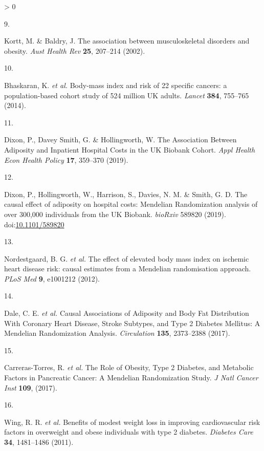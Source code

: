 \documentclass[11pt,twoside]{bristolthesis}
\newlength{\cslhangindent}
\newlength{\csllabelwidth}
\newenvironment{CSLReferences}[2] %
 {%
  \setlength{\parindent}{0pt}
  \ifodd #1 \everypar{\setlength{\hangindent}{\cslhangindent}}\ignorespaces\fi
  \ifnum #2 > 0
  \setlength{\parskip}{#2\baselineskip}
  \fi
 }%
 {}
\newcommand{\CSLLeftMargin}[1]{\parbox[t]{\csllabelwidth}{#1}}
\newcommand{\CSLRightInline}[1]{\parbox[t]{\linewidth - \csllabelwidth}{#1}\break}
\begin{document}
\begin{CSLReferences}{0}{0}
\leavevmode\hypertarget{ref-Kortt2002}{}%
\CSLLeftMargin{9. }
\CSLRightInline{Kortt, M. \& Baldry, J. {The association between musculoskeletal disorders and obesity}. \emph{Aust Health Rev} \textbf{25}, 207--214 (2002).}

\leavevmode\hypertarget{ref-Bhaskaran2014}{}%
\CSLLeftMargin{10. }
\CSLRightInline{Bhaskaran, K. \emph{et al.} {Body-mass index and risk of 22 specific cancers: a population-based cohort study of 5{{}}24 million UK adults}. \emph{Lancet} \textbf{384}, 755--765 (2014).}

\leavevmode\hypertarget{ref-Dixon2019a}{}%
\CSLLeftMargin{11. }
\CSLRightInline{Dixon, P., Davey Smith, G. \& Hollingworth, W. {The Association Between Adiposity and Inpatient Hospital Costs in the UK Biobank Cohort}. \emph{Appl Health Econ Health Policy} \textbf{17}, 359--370 (2019).}

\leavevmode\hypertarget{ref-Dixon2019}{}%
\CSLLeftMargin{12. }
\CSLRightInline{Dixon, P., Hollingworth, W., Harrison, S., Davies, N. M. \& Smith, G. D. {The causal effect of adiposity on hospital costs: Mendelian Randomization analysis of over 300,000 individuals from the UK Biobank}. \emph{bioRxiv} 589820 (2019). doi:\href{https://doi.org/10.1101/589820}{10.1101/589820}}

\leavevmode\hypertarget{ref-Nordestgaard2012}{}%
\CSLLeftMargin{13. }
\CSLRightInline{Nordestgaard, B. G. \emph{et al.} {The effect of elevated body mass index on ischemic heart disease risk: causal estimates from a Mendelian randomisation approach}. \emph{PLoS Med} \textbf{9}, e1001212 (2012).}

\leavevmode\hypertarget{ref-Dale2017}{}%
\CSLLeftMargin{14. }
\CSLRightInline{Dale, C. E. \emph{et al.} {Causal Associations of Adiposity and Body Fat Distribution With Coronary Heart Disease, Stroke Subtypes, and Type 2 Diabetes Mellitus: A Mendelian Randomization Analysis}. \emph{Circulation} \textbf{135}, 2373--2388 (2017).}

\leavevmode\hypertarget{ref-Carreras-Torres2017a}{}%
\CSLLeftMargin{15. }
\CSLRightInline{Carreras-Torres, R. \emph{et al.} {The Role of Obesity, Type 2 Diabetes, and Metabolic Factors in Pancreatic Cancer: A Mendelian Randomization Study}. \emph{J Natl Cancer Inst} \textbf{109}, (2017).}

\leavevmode\hypertarget{ref-Wing2011}{}%
\CSLLeftMargin{16. }
\CSLRightInline{Wing, R. R. \emph{et al.} {Benefits of modest weight loss in improving cardiovascular risk factors in overweight and obese individuals with type 2 diabetes}. \emph{Diabetes Care} \textbf{34}, 1481--1486 (2011).}


\end{CSLReferences}
\end{document}
